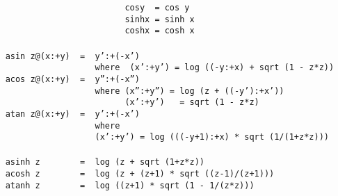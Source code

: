 \mbox{\tt \ \ \ \ \ \ \ \ \ \ \ \ \ \ \ \ \ \ \ \ \ \ \ \ \ \ \ \ cosy\ \ =\ cos\ y}\\
\mbox{\tt \ \ \ \ \ \ \ \ \ \ \ \ \ \ \ \ \ \ \ \ \ \ \ \ \ \ \ \ sinhx\ =\ sinh\ x}\\
\mbox{\tt \ \ \ \ \ \ \ \ \ \ \ \ \ \ \ \ \ \ \ \ \ \ \ \ \ \ \ \ coshx\ =\ cosh\ x}\\
\mbox{\tt }\\
\mbox{\tt \ \ \ \ asin\ z@(x:+y)\ \ =\ \ y':+(-x')}\\
\mbox{\tt \ \ \ \ \ \ \ \ \ \ \ \ \ \ \ \ \ \ \ \ \ \ where\ \ (x':+y')\ =\ log\ ((-y:+x)\ +\ sqrt\ (1\ -\ z*z))}\\
\mbox{\tt \ \ \ \ acos\ z@(x:+y)\ \ =\ \ y'':+(-x'')}\\
\mbox{\tt \ \ \ \ \ \ \ \ \ \ \ \ \ \ \ \ \ \ \ \ \ \ where\ (x'':+y'')\ =\ log\ (z\ +\ ((-y'):+x'))}\\
\mbox{\tt \ \ \ \ \ \ \ \ \ \ \ \ \ \ \ \ \ \ \ \ \ \ \ \ \ \ \ \ (x':+y')\ \ \ =\ sqrt\ (1\ -\ z*z)}\\
\mbox{\tt \ \ \ \ atan\ z@(x:+y)\ \ =\ \ y':+(-x')}\\
\mbox{\tt \ \ \ \ \ \ \ \ \ \ \ \ \ \ \ \ \ \ \ \ \ \ where}\\
\mbox{\tt \ \ \ \ \ \ \ \ \ \ \ \ \ \ \ \ \ \ \ \ \ \ (x':+y')\ =\ log\ (((-y+1):+x)\ *\ sqrt\ (1/(1+z*z)))}\\
\mbox{\tt }\\
\mbox{\tt \ \ \ \ asinh\ z\ \ \ \ \ \ \ \ =\ \ log\ (z\ +\ sqrt\ (1+z*z))}\\
\mbox{\tt \ \ \ \ acosh\ z\ \ \ \ \ \ \ \ =\ \ log\ (z\ +\ (z+1)\ *\ sqrt\ ((z-1)/(z+1)))}\\
\mbox{\tt \ \ \ \ atanh\ z\ \ \ \ \ \ \ \ =\ \ log\ ((z+1)\ *\ sqrt\ (1\ -\ 1/(z*z)))}
\eprogB
